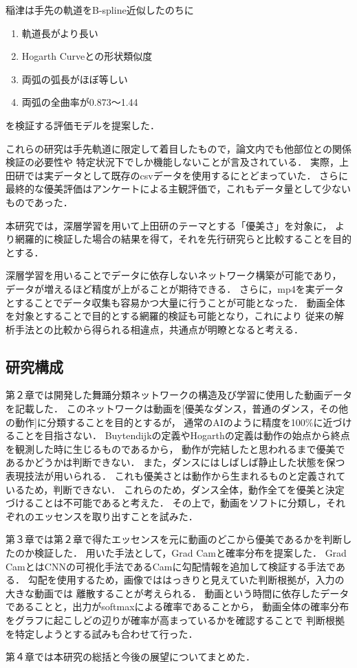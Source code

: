 \clearpage

稲津は手先の軌道をB-spline近似したのちに
\begin{enumerate}
  \item 軌道長がより長い
  \item Hogarth Curveとの形状類似度
  \item 両弧の弧長がほぼ等しい
  \item 両弧の全曲率が0.873〜1.44
\end{enumerate}
を検証する評価モデルを提案した．

これらの研究は手先軌道に限定して着目したもので，論文内でも他部位との関係検証の必要性や
特定状況下でしか機能しないことが言及されている．
実際，上田研では実データとして既存のcsvデータを使用するにとどまっていた．
さらに最終的な優美評価はアンケートによる主観評価で，これもデータ量として少ないものであった．

本研究では，深層学習を用いて上田研のテーマとする「優美さ」を対象に，
より網羅的に検証した場合の結果を得て，それを先行研究らと比較することを目的とする．

深層学習を用いることでデータに依存しないネットワーク構築が可能であり，
データが増えるほど精度が上がることが期待できる．
さらに，mp4を実データとすることでデータ収集も容易かつ大量に行うことが可能となった．
動画全体を対象とすることで目的とする網羅的検証も可能となり，これにより
従来の解析手法との比較から得られる相違点，共通点が明瞭となると考える．

\subsection{研究構成}
第２章では開発した舞踊分類ネットワークの構造及び学習に使用した動画データを記載した．
このネットワークは動画を[優美なダンス，普通のダンス，その他の動作]に分類することを目的とするが，
通常のAIのように精度を100\%に近づけることを目指さない．
Buytendijkの定義やHogarthの定義は動作の始点から終点を観測した時に生じるものであるから，
動作が完結したと思われるまで優美であるかどうかは判断できない．
また，ダンスにはしばしば静止した状態を保つ表現技法が用いられる．
これも優美さとは動作から生まれるものと定義されているため，判断できない．
これらのため，ダンス全体，動作全てを優美と決定づけることは不可能であると考えた．
その上で，動画をソフトに分類し，それぞれのエッセンスを取り出すことを試みた．

第３章では第２章で得たエッセンスを元に動画のどこから優美であるかを判断したのか検証した．
用いた手法として，Grad Cam\cite{gradcam}と確率分布を提案した．
Grad CamとはCNNの可視化手法であるCam\cite{cam}に勾配情報を追加して検証する手法である．
勾配を使用するため，画像でははっきりと見えていた判断根拠が，入力の大きな動画では
離散することが考えられる．
動画という時間に依存したデータであることと，出力がsoftmaxによる確率であることから，
動画全体の確率分布をグラフに起こしどの辺りが確率が高まっているかを確認することで
判断根拠を特定しようとする試みも合わせて行った．

第４章では本研究の総括と今後の展望についてまとめた．